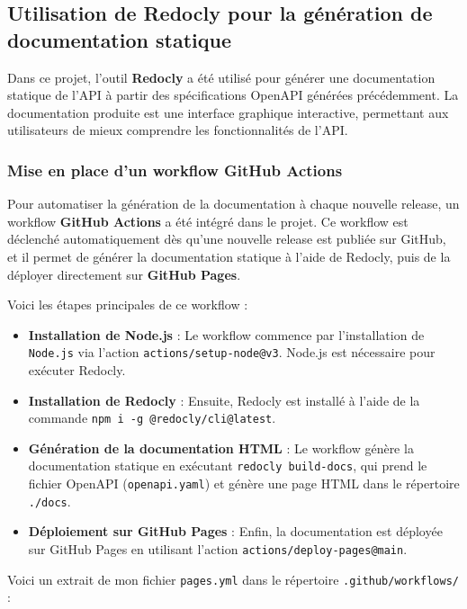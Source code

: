 \documentclass{article}
\begin{document}
	\subsection{Utilisation de Redocly pour la génération de documentation statique}
	\label{subsec:redocly}
	
	Dans ce projet, l'outil \textbf{Redocly} a été utilisé pour générer une documentation statique de l'API à partir des spécifications OpenAPI générées précédemment. La documentation produite est une interface graphique interactive, permettant aux utilisateurs de mieux comprendre les fonctionnalités de l'API.
	
	\subsubsection{Mise en place d'un workflow GitHub Actions}
	
	Pour automatiser la génération de la documentation à chaque nouvelle release, un workflow \textbf{GitHub Actions} a été intégré dans le projet. Ce workflow est déclenché automatiquement dès qu'une nouvelle release est publiée sur GitHub, et il permet de générer la documentation statique à l'aide de Redocly, puis de la déployer directement sur \textbf{GitHub Pages}.
	
	Voici les étapes principales de ce workflow :
	\begin{itemize}
		\item \textbf{Installation de Node.js} : Le workflow commence par l'installation de \texttt{Node.js} via l'action \texttt{actions/setup-node@v3}. Node.js est nécessaire pour exécuter Redocly.
		\item \textbf{Installation de Redocly} : Ensuite, Redocly est installé à l'aide de la commande \texttt{npm i -g @redocly/cli@latest}.
		\item \textbf{Génération de la documentation HTML} : Le workflow génère la documentation statique en exécutant \texttt{redocly build-docs}, qui prend le fichier OpenAPI (\texttt{openapi.yaml}) et génère une page HTML dans le répertoire \texttt{./docs}.
		\item \textbf{Déploiement sur GitHub Pages} : Enfin, la documentation est déployée sur GitHub Pages en utilisant l'action \texttt{actions/deploy-pages@main}.
	\end{itemize}
	
	Voici un extrait de mon fichier \texttt{pages.yml} dans le répertoire \texttt{.github/workflows/} :
	
\end{document}
